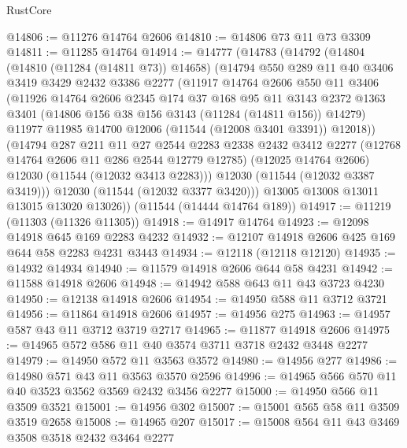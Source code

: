 \begin{lexlean}{RustCore}
\begin{coremodule}
@14806 := @11276 @14764 @2606
@14810 := @14806 @73 @11 @73 @3309
@14811 := @11285 @14764
@14914 := @14777
    (@14783
      (@14792
        (@14804
          (@14810 (@11284 (@14811 @73)) @14658)
          (@14794
            @550
            @289
            @11
            @40
            @3406
            @3419
            @3429
            @2432
            @3386
            @2277
            (@11917
              @14764
              @2606
              @550
              @11
              @3406
              (@11926
                @14764
                @2606
                @2345
                @174
                @37
                @168
                @95
                @11
                @3143
                @2372
                @1363
                @3401
                (@14806 @156 @38 @156 @3143 (@11284 (@14811 @156)) @14279)
                @11977
                @11985
                @14700
                @12006
                (@11544 (@12008 @3401 @3391))
                @12018))
            (@14794
              @287
              @211
              @11
              @27
              @2544
              @2283
              @2338
              @2432
              @3412
              @2277
              (@12768 @14764 @2606 @11 @286 @2544 @12779 @12785)
              (@12025 @14764 @2606)
              @12030
              (@11544 (@12032 @3413 @2283)))
            @12030
            (@11544 (@12032 @3387 @3419)))
          @12030
          (@11544 (@12032 @3377 @3420)))
        @13005
        @13008
        @13011
        @13015
        @13020
        @13026))
    (@11544 (@14444 @14764 @189))
@14917 := @11219 (@11303 (@11326 @11305))
@14918 := @14917 @14764
@14923 := @12098 @14918 @645 @169 @2283 @4232
@14932 := @12107 @14918 @2606 @425 @169 @644 @58 @2283 @4231 @3443
@14934 := @12118 (@12118 @12120)
@14935 := @14932 @14934
@14940 := @11579 @14918 @2606 @644 @58 @4231
@14942 := @11588 @14918 @2606
@14948 := @14942 @588 @643 @11 @43 @3723 @4230
@14950 := @12138 @14918 @2606
@14954 := @14950 @588 @11 @3712 @3721
@14956 := @11864 @14918 @2606
@14957 := @14956 @275
@14963 := @14957 @587 @43 @11 @3712 @3719 @2717
@14965 := @11877 @14918 @2606
@14975 := @14965 @572 @586 @11 @40 @3574 @3711 @3718 @2432 @3448 @2277
@14979 := @14950 @572 @11 @3563 @3572
@14980 := @14956 @277
@14986 := @14980 @571 @43 @11 @3563 @3570 @2596
@14996 := @14965 @566 @570 @11 @40 @3523 @3562 @3569 @2432 @3456 @2277
@15000 := @14950 @566 @11 @3509 @3521
@15001 := @14956 @302
@15007 := @15001 @565 @58 @11 @3509 @3519 @2658
@15008 := @14965 @207
@15017 := @15008 @564 @11 @43 @3469 @3508 @3518 @2432 @3464 @2277

\end{coremodule}
\end{lexlean}
